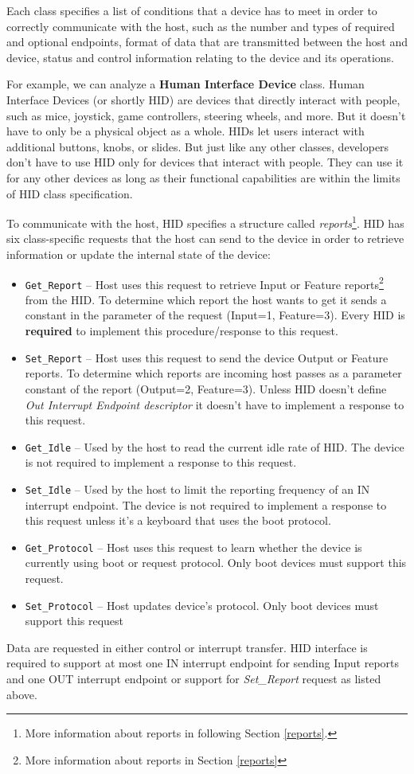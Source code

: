 Each class specifies a list of conditions that a device has to meet in order to correctly communicate with the host, such as the number and types of required and optional endpoints, format of data that are transmitted between the host and device, status and control information relating to the device and its operations.

\newpage
For example, we can analyze a \textbf{Human Interface Device} class. Human Interface Devices (or shortly HID) are devices that directly interact with people, such as mice, joystick, game controllers, steering wheels, and more. But it doesn't have to only be a physical object as a whole. HIDs let users interact with additional buttons, knobs, or slides. But just like any other classes, developers don't have to use HID only for devices that interact with people. They can use it for any other devices as long as their functional capabilities are within the limits of HID class
specification.

To communicate with the host, HID specifies a structure called \emph{reports}\footnote{More information about reports in following Section \ref{reports}.}. HID has six class-specific requests that the host can send to the device in order to retrieve information or update the internal state of the device:
\begin{itemize}
    \item \verb|Get_Report| \--- Host uses this request to retrieve Input or Feature reports\footnote{More information about reports in Section \ref{reports}} from the HID. To determine which report the host wants to get it sends a constant in the parameter of the request (Input=1, Feature=3). Every HID is \textbf{required} to implement this procedure/response to this request. 
    \item \verb|Set_Report| \--- Host uses this request to send the device Output or Feature reports. To determine which reports are incoming host passes as a parameter constant of the report (Output=2, Feature=3). Unless HID doesn't define \emph{Out Interrupt Endpoint descriptor} it doesn't have to implement a response to this request. 
    \item \verb|Get_Idle| \--- Used by the host to read the current idle rate of HID. The device is not required to implement a response to this request. 
    \item \verb|Set_Idle| \--- Used by the host to limit the reporting frequency of an IN interrupt endpoint. The device is not required to implement a response to this request unless it's a keyboard that uses the boot protocol.
    \item \verb|Get_Protocol| \--- Host uses this request to learn whether the device is currently using boot or request protocol. Only boot devices must support this request.
    \item \verb|Set_Protocol| \--- Host updates device's protocol. Only boot devices must support this request
\end{itemize}
Data are requested in either control or interrupt transfer. HID interface is required to support at most one IN interrupt endpoint for sending Input reports and one OUT interrupt endpoint or support for \emph{Set\_Report} request as listed above.

